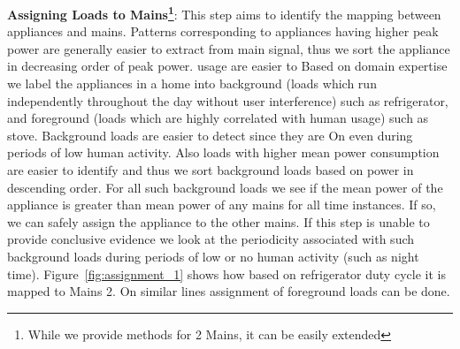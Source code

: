 \documentclass[conference]{IEEEtran}
\newcommand{\figref}[1]{Figure~\ref{#1}}
\begin{document}
\textbf{Assigning Loads to Mains\footnote{While we provide methods for 2 Mains, it can be easily extended}}:
This step aims to identify the mapping between appliances and mains. Patterns corresponding to appliances having higher peak power are generally easier to extract from main signal, thus we sort the appliance in decreasing order of peak power. usage are easier to Based on domain expertise we label the appliances in a home into background (loads which run independently throughout the day without user interference) such as refrigerator, and foreground (loads which are highly correlated with human usage) such as stove. Background loads are easier to detect since they are On even during periods of low human activity. Also loads with higher mean power consumption are easier to identify and thus we sort background loads based on power in descending order. For all such background loads we see if the mean power of the appliance is greater than mean power of any mains for all time instances. If so, we can safely assign the appliance to the other mains. If this step is unable to provide conclusive evidence we look at the periodicity associated with such background loads during periods of low or no human activity (such as night time). \figref{fig:assignment_1} shows how based on refrigerator duty cycle it is mapped to Mains 2. On similar lines assignment of foreground loads can be done.
\end{document}
